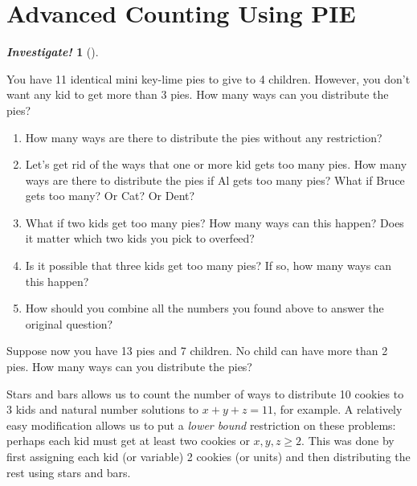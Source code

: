 \documentclass[10pt,]{book}
\theoremstyle{plain}
\theoremstyle{definition}
\theoremstyle{definition}
\newtheorem{investigation}[project]{\emph{Investigate!}}
\theoremstyle{definition}
\numberwithin{equation}{section}
\begin{document}
\section[Advanced Counting Using PIE]{Advanced Counting Using PIE}\label{sec_advPIE}
\typeout{************************************************}
\typeout{************************************************}
\begin{investigation}[]\label{investigation-11}

        You have 11 identical mini key-lime pies to give to 4 children. However, you don't want any kid to get more than 3 pies. How many ways can you distribute the pies?

      \leavevmode%
\begin{enumerate}
\item\hypertarget{li-609}{}
            How many ways are there to distribute the pies without any restriction?
\item\hypertarget{li-610}{}
            Let's get rid of the ways that one or more kid gets too many pies. How many ways are there to distribute the pies if Al gets too many pies? What if Bruce gets too many? Or Cat? Or Dent?
\item\hypertarget{li-611}{}
            What if two kids get too many pies? How many ways can this happen? Does it matter which two kids you pick to overfeed?
\item\hypertarget{li-612}{}
            Is it possible that three kids get too many pies? If so, how many ways can this happen?
\item\hypertarget{li-613}{}
            How should you combine all the numbers you found above to answer the original question?
\end{enumerate}

%
\par

        Suppose now you have 13 pies and 7 children. No child can have more than 2 pies. How many ways can you distribute the pies?
\end{investigation}

      Stars and bars allows us to count the number of ways to distribute 10 cookies to 3 kids and natural number solutions to \(x+y+z = 11\), for example. A relatively easy modification allows us to put a \emph{lower bound} restriction on these problems: perhaps each kid must get at least two cookies or \(x,y,z \ge 2\). This was done by first assigning each kid (or variable) 2 cookies (or units) and then distributing the rest using stars and bars.
\par
\end{document}
